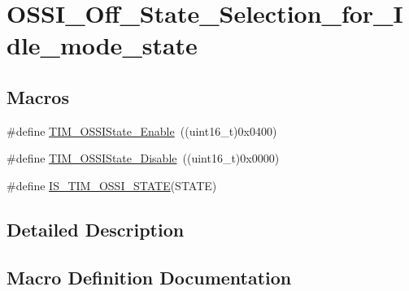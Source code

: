 \hypertarget{group___o_s_s_i___off___state___selection__for___idle__mode__state}{}\section{O\+S\+S\+I\+\_\+\+Off\+\_\+\+State\+\_\+\+Selection\+\_\+for\+\_\+\+Idle\+\_\+mode\+\_\+state}
\label{group___o_s_s_i___off___state___selection__for___idle__mode__state}
\subsection*{Macros}
\begin{DoxyCompactItemize}
\item 
\#define \mbox{\hyperlink{group___o_s_s_i___off___state___selection__for___idle__mode__state_gaf643ec0d2edb6c8fb725d00210b3d071}{T\+I\+M\+\_\+\+O\+S\+S\+I\+State\+\_\+\+Enable}}~((uint16\+\_\+t)0x0400)
\item 
\#define \mbox{\hyperlink{group___o_s_s_i___off___state___selection__for___idle__mode__state_gae1962736fd5cad82e97a5814ef6758bd}{T\+I\+M\+\_\+\+O\+S\+S\+I\+State\+\_\+\+Disable}}~((uint16\+\_\+t)0x0000)
\item 
\#define \mbox{\hyperlink{group___o_s_s_i___off___state___selection__for___idle__mode__state_gad24fc8836152903b408239284cecfab1}{I\+S\+\_\+\+T\+I\+M\+\_\+\+O\+S\+S\+I\+\_\+\+S\+T\+A\+TE}}(S\+T\+A\+TE)
\end{DoxyCompactItemize}


\subsection{Detailed Description}


\subsection{Macro Definition Documentation}
\mbox{\label{group___o_s_s_i___off___state___selection__for___idle__mode__state_gad24fc8836152903b408239284cecfab1}} 
